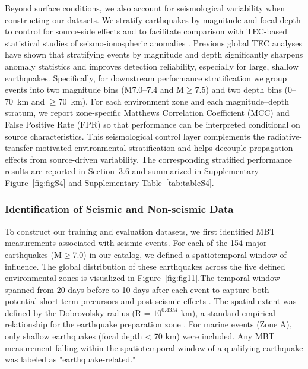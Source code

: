 \documentclass[preprint,review,12pt,authoryear]{elsarticle}
\begin{document}
Beyond surface conditions, we also account for seismological variability when constructing our datasets. We stratify earthquakes by magnitude and focal depth to control for source-side effects and to facilitate comparison with TEC-based statistical studies of seismo-ionospheric anomalies \citep{shahJin2015,shahTotalElectronContent2020,shahASR2022}. Previous global TEC analyses have shown that stratifying events by magnitude and depth significantly sharpens anomaly statistics and improves detection reliability, especially for large, shallow earthquakes. Specifically, for downstream performance stratification we group events into two magnitude bins (M7.0--7.4 and M$\ge$7.5) and two depth bins (0--70~km and $\ge$70~km). For each environment zone and each magnitude--depth stratum, we report zone-specific Matthews Correlation Coefficient (MCC) and False Positive Rate (FPR) so that performance can be interpreted conditional on source characteristics. This seismological control layer complements the radiative-transfer-motivated environmental stratification and helps decouple propagation effects from source-driven variability. The corresponding stratified performance results are reported in Section~3.6 and summarized in Supplementary Figure~\ref{fig:figS4} and Supplementary Table~\ref{tab:tableS4}.

\subsubsection{Identification of Seismic and Non-seismic Data}\label{sec:data_identification}
To construct our training and evaluation datasets, we first identified MBT measurements associated with seismic events. For each of the 154 major earthquakes (M$\ge$7.0) in our catalog, we defined a spatiotemporal window of influence. The global distribution of these earthquakes across the five defined environmental zones is visualized in Figure~\ref{fig:fig11}.The temporal window spanned from 20 days before to 10 days after each event to capture both potential short-term precursors and post-seismic effects \citep{akhoondzadehMultiPrecursorsAnalysis2018,qiSpatiotemporallyWeightedTwostep2020}. The spatial extent was defined by the Dobrovolsky radius (R = $10^{0.43M}$ km), a standard empirical relationship for the earthquake preparation zone \citep{dobrovolskyEstimationSizeEarthquake1979}. For marine events (Zone A), only shallow earthquakes (focal depth < 70 km) were included. Any MBT measurement falling within the spatiotemporal window of a qualifying earthquake was labeled as "earthquake-related."
\end{document}
